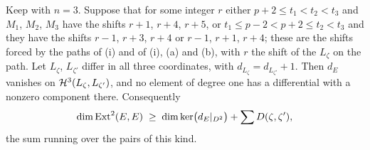 \begin{lemma}\label{lem:allthree}
Keep  with $n=3$. Suppose that for some integer $r$
either $p+2\le t_{1}<t_{2}<t_{3}$ and $M_{1}$, $M_{2}$, $M_{3}$ have the
shifts $r+1$, $r+4$, $r+5$, or $t_{1}\le p-2<p+2\le t_{2}<t_{3}$ and they
have the shifts $r-1$, $r+3$, $r+4$ or $r-1$, $r+1$, $r+4$; these are the
shifts forced by the paths of (i) and of
(i), (a) and (b), with $r$ the shift of the
$L_{\zeta}$ on the path. Let $L_{\zeta}$, $L_{\zeta'}$ differ in all three
coordinates, with $d_{L_{\zeta}}=d_{L_{\zeta'}}+1$. Then $d_{E}$ vanishes on
$\mathcal{H}^{3}(L_{\zeta},L_{\zeta'})$, and no element of degree one has a
differential with a nonzero component there. Consequently
\[
  \dim\operatorname{Ext}^{2}(E,E)\;\ge\;\dim\ker\bigl(d_{E}|_{D^{2}}\bigr)
  +\sum D(\zeta,\zeta'),
\]
the sum running over the pairs of this kind.
\end{lemma}

